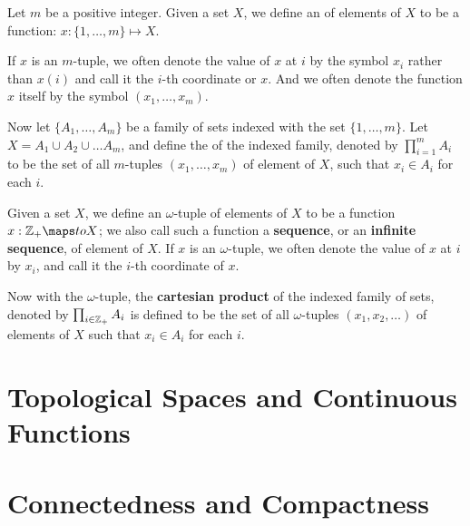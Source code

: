 \begin{definition}[$m$-tuple]
Let $m$ be a positive integer. Given a set $X$, we define an \textbf{} of elements of $X$ to be a function: $x: \{1, \dots, m\} \mapsto X$.
\end{definition}

If $x$ is an $m$-tuple, we often denote the value of $x$ at $i$ by the symbol $x_i$ rather than $x(i)$ and call it the $i$-th coordinate or $x$. And we often denote the function $x$ itself by the symbol $(x_1, \dots, x_m)$.

Now let $\{A_1, \dots, A_m\}$ be a family of sets indexed with the set $\{1, \dots, m\}$. Let $X = A_1 \cup A_2 \cup \dots A_m$, and define the \textbf{} of the indexed family, denoted by $\prod_{i = 1}^{m} A_i$ to be the set of all $m$-tuples $(x_1, \dots, x_m)$ of element of $X$, such that $x_i \in A_i$ for each $i$.

\begin{definition}
Given a set $X$, we define an $\omega$-tuple of elements of $X$ to be a function $x: \Z_{+} \maps to X$; we also call such a function a \textbf{sequence}, or an \textbf{infinite sequence}, of element of $X$. If $x$ is an $\omega$-tuple, we often denote the value of $x$ at $i$ by $x_i$, and call it the $i$-th coordinate of $x$. 
\end{definition}

Now with the $\omega$-tuple, the \textbf{cartesian product} of the indexed family of sets, denoted by $\prod_{i \in \mathbb{Z}_+} A_i$ is defined to be the set of all $\omega$-tuples $(x_1, x_2, \dots)$ of elements of $X$ such that $x_i \in A_i$ for each $i$.



\section{Topological Spaces and Continuous Functions}

\section{Connectedness and Compactness}
